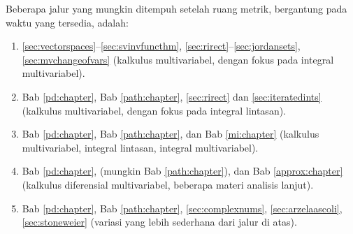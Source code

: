 Beberapa jalur yang mungkin ditempuh setelah ruang metrik, bergantung pada
waktu yang tersedia, adalah:
\begin{enumerate}[1)]
\item
\ref{sec:vectorspaces}--\ref{sec:svinvfuncthm},
\ref{sec:rirect}--\ref{sec:jordansets}, \ref{sec:mvchangeofvars}
(kalkulus multivariabel, dengan fokus pada integral multivariabel).
\item
Bab \ref{pd:chapter}, Bab \ref{path:chapter},
\ref{sec:rirect} dan \ref{sec:iteratedints}
(kalkulus multivariabel, dengan fokus pada integral lintasan).
\item Bab \ref{pd:chapter}, Bab \ref{path:chapter}, dan Bab
\ref{mi:chapter}
(kalkulus multivariabel, integral lintasan, integral multivariabel).
\item
Bab \ref{pd:chapter}, (mungkin Bab \ref{path:chapter}), dan Bab \ref{approx:chapter}
(kalkulus diferensial multivariabel, beberapa materi analisis lanjut).
\item
Bab \ref{pd:chapter}, Bab \ref{path:chapter},
\ref{sec:complexnums},
\ref{sec:arzelaascoli},
\ref{sec:stoneweier}
(variasi yang lebih sederhana dari jalur di atas).
\end{enumerate}

